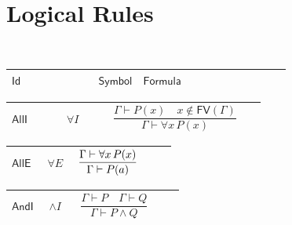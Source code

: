 \documentclass[12pt,reqno]{amsart}
\theoremstyle{blueplain}
\numberwithin{equation}{section}
\newlength{\FATOUOneColumnBody}
\begin{document}
{\scriptsize \ }

\section{\protect\scriptsize Logical Rules}

{\scriptsize {\ }}

{\scriptsize \setlength{\parskip}{0pt}\nointerlineskip
\noindent 
\begin{tabular}{|@{}>{\centering\arraybackslash}m{\FATOUOneColumnBody}|}
\hline
$\displaystyle \mathsf{Logic}$ \\ \hline
\end{tabular}%
}

{\scriptsize \setlength{\parskip}{0pt}\nointerlineskip
\noindent 
\begin{tabular}{|@{}>{\centering\arraybackslash}m{0.19251\linewidth}|>{\centering\arraybackslash}m{0.16845\linewidth}|>{\centering\arraybackslash}m{0.53904\linewidth}|}
\hline
$\displaystyle \mathsf{Id}$ & $\displaystyle \mathsf{Symbol}$ & $%
\displaystyle \mathsf{Formula}$ \\ \hline
\end{tabular}%
}

{\scriptsize \setlength{\parskip}{0pt}\nointerlineskip
\noindent 
\begin{tabular}{|@{}>{\centering\arraybackslash}m{0.19251\linewidth}|>{\centering\arraybackslash}m{0.16845\linewidth}|>{\centering\arraybackslash}m{0.53904\linewidth}|}
\hline
\hypertarget{rule:AllI}{$\displaystyle \mathsf{AllI}$} & $\displaystyle %
\forall I$ & \rule[-3.3ex]{0pt}{7.8ex}$\displaystyle \dfrac{\Gamma\vdash
P(x)\quad x\notin\mathsf{FV}(\Gamma)}{\Gamma\vdash\forall x\,P(x)}$ \\ \hline
\end{tabular}%
}

{\scriptsize \setlength{\parskip}{0pt}\nointerlineskip
\noindent 
\begin{tabular}{|@{}>{\centering\arraybackslash}m{0.19251\linewidth}|>{\centering\arraybackslash}m{0.16845\linewidth}|>{\centering\arraybackslash}m{0.53904\linewidth}|}
\hline
\hypertarget{rule:AllE}{$\displaystyle \mathsf{AllE}$} & $\displaystyle %
\forall E$ & \rule[-3.3ex]{0pt}{7.8ex}$\displaystyle \dfrac{%
\Gamma\vdash\forall x\,P(x)}{\Gamma\vdash P(a)}$ \\ \hline
\end{tabular}%
}

{\scriptsize \setlength{\parskip}{0pt}\nointerlineskip
\noindent 
\begin{tabular}{|@{}>{\centering\arraybackslash}m{0.19251\linewidth}|>{\centering\arraybackslash}m{0.16845\linewidth}|>{\centering\arraybackslash}m{0.53904\linewidth}|}
\hline
\hypertarget{rule:AndI}{$\displaystyle \mathsf{AndI}$} & $\displaystyle %
\wedge I$ & \rule[-3.3ex]{0pt}{7.8ex}$\displaystyle \dfrac{\Gamma\vdash
P\quad\Gamma\vdash Q}{\Gamma\vdash P\land Q}$ \\ \hline
\end{tabular}%
}
\end{document}
